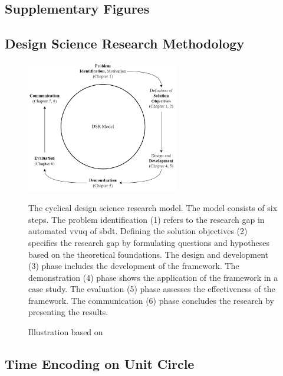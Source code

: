 \begin{appendices}
  \chapter{Supplementary Figures}
  \label{app:supp_figures}

  \section{Design Science Research Methodology}
  \label{app:dsr_figure}
  \begin{figure}[htbp]
    \centering
    \includegraphics[width=0.6\textwidth]{figures/dsr.png}
    \caption[Design Science Methodology]{The cyclical design science research model. The model consists of six steps. The problem identification (1) refers to the research gap in automated \gls{vvuq} of \gls{sbdt}. Defining the solution objectives (2) specifies the research gap by formulating questions and hypotheses based on the theoretical foundations. The design and development (3) phase includes the development of the framework. The demonstration (4) phase shows the application of the framework in a case study. The evaluation (5) phase assesses the effectiveness of the framework. The communication (6) phase concludes the research by presenting the results.}
    \label{fig:DSR}
    \caption*{Illustration based on \textcite{peffers2007design}}
  \end{figure}

  \section{Time Encoding on Unit Circle}
  \label{app:time_encoding_figure}
  \begin{figure}[htbp]
    \centering
    \begin{tikzpicture}[
        scale=3,
        hour dot/.style={circle, fill=blue!70, inner sep=1.5pt},
        hour label/.style={font=\small}
      ]


\end{tikzpicture}
\end{figure}
\end{appendices}
